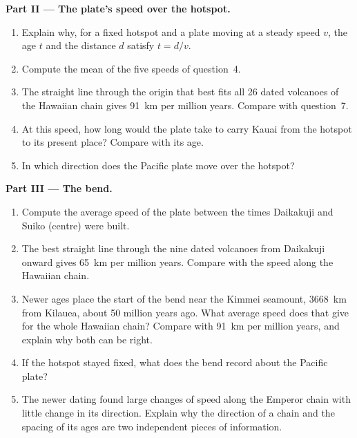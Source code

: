 \begin{problem}
\medskip
\noindent\textbf{Part II --- The plate's speed over the hotspot.}
\begin{enumerate}[resume]
  \item Explain why, for a fixed hotspot and a plate moving at a steady
        speed $v$, the age $t$ and the distance $d$ satisfy $t = d/v$.
  \item Compute the mean of the five speeds of question~4.
  \item The straight line through the origin that best fits all 26 dated
        volcanoes of the Hawaiian chain gives \qty{91}{km} per million years.
        Compare with question~7.
  \item At this speed, how long would the plate take to carry Kauai from the
        hotspot to its present place? Compare with its age.
  \item In which direction does the Pacific plate move over the hotspot?
\end{enumerate}

\medskip
\noindent\textbf{Part III --- The bend.}
\begin{enumerate}[resume]
  \item Compute the average speed of the plate between the times Daikakuji
        and Suiko (centre) were built.
  \item The best straight line through the nine dated volcanoes from
        Daikakuji onward gives \qty{65}{km} per million years. Compare with
        the speed along the Hawaiian chain.
  \item Newer ages place the start of the bend near the Kimmei
        seamount, \qty{3668}{km} from Kilauea, about 50 million years ago.
        What average speed does that give for the whole Hawaiian chain?
        Compare with \qty{91}{km} per million years, and explain why both can
        be right.
  \item If the hotspot stayed fixed, what does the bend record about the
        Pacific plate?
  \item The newer dating found large changes of speed along the Emperor chain
        with little change in its direction. Explain why the direction of a
        chain and the spacing of its ages are two independent pieces of
        information.
\end{enumerate}


\end{problem}
